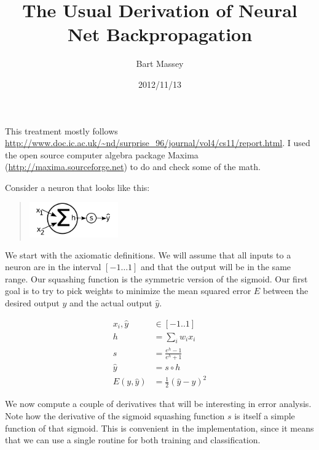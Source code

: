 \documentclass[12pt]{article}
\title{The Usual Derivation of Neural Net Backpropagation}
\author{Bart Massey}
\date{2012/11/13}
\newcommand{\yhat}{{\hat y}}
\newcommand{\Half}{{\frac 1 2}}
\begin{document}
\maketitle
This treatment mostly follows
\url{http://www.doc.ic.ac.uk/~nd/surprise_96/journal/vol4/cs11/report.html}.
I used the open source computer algebra package Maxima
(\url{http://maxima.sourceforge.net}) to do
and check some of the math.

Consider a neuron that looks like this:
\begin{quotation}
\includegraphics[height=0.6in]{neuron.pdf}
\end{quotation}

We start with the axiomatic definitions. We will assume that
all inputs to a neuron are in the interval $[-1\ldots 1]$
and that the output will be in the same range. Our squashing
function is the symmetric version of the sigmoid.  Our first
goal is to try to pick weights to minimize the mean squared
error $E$ between the desired output $y$ and the actual
output $\yhat$.

\begin{align}
x_i, \yhat &\in [-1..1] \\
h &= \sum_i{w_i x_i} \\
s &= \frac{e^h - 1}{e^h + 1} \\
\yhat &= s \circ h \\
E(y, \yhat) &= \Half (\yhat - y)^2
\end{align}

We now compute a couple of derivatives that will be
interesting in error analysis. Note how the derivative of
the sigmoid squashing function $s$ is itself a simple
function of that sigmoid.  This is convenient in the
implementation, since it means that we can use a single
routine for both training and classification.
\end{document}
